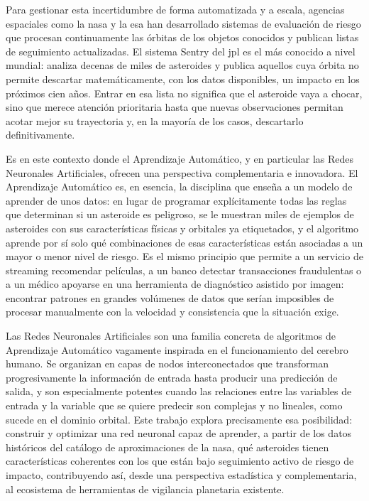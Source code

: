\documentclass[12pt]{report} %
\begin{document}
Para gestionar esta incertidumbre de forma automatizada y a escala, agencias espaciales como la \gls{nasa} y la \gls{esa} han desarrollado sistemas de evaluación de riesgo que procesan continuamente las órbitas de los objetos conocidos y publican listas de seguimiento actualizadas. El sistema Sentry del \gls{jpl} es el más conocido a nivel mundial: analiza decenas de miles de asteroides y publica aquellos cuya órbita no permite descartar matemáticamente, con los datos disponibles, un impacto en los próximos cien años. Entrar en esa lista no significa que el asteroide vaya a chocar, sino que merece atención prioritaria hasta que nuevas observaciones permitan acotar mejor su trayectoria y, en la mayoría de los casos, descartarlo definitivamente.
 
Es en este contexto donde el Aprendizaje Automático, y en particular las Redes Neuronales Artificiales, ofrecen una perspectiva complementaria e innovadora. El Aprendizaje Automático es, en esencia, la disciplina que enseña a un modelo de aprender de unos datos: en lugar de programar explícitamente todas las reglas que determinan si un asteroide es peligroso, se le muestran miles de ejemplos de asteroides con sus características físicas y orbitales ya etiquetados, y el algoritmo aprende por sí solo qué combinaciones de esas características están asociadas a un mayor o menor nivel de riesgo. Es el mismo principio que permite a un servicio de streaming recomendar películas, a un banco detectar transacciones fraudulentas o a un médico apoyarse en una herramienta de diagnóstico asistido por imagen: encontrar patrones en grandes volúmenes de datos que serían imposibles de procesar manualmente con la velocidad y consistencia que la situación exige.
 
Las Redes Neuronales Artificiales son una familia concreta de algoritmos de Aprendizaje Automático vagamente inspirada en el funcionamiento del cerebro humano. Se organizan en capas de nodos interconectados que transforman progresivamente la información de entrada hasta producir una predicción de salida, y son especialmente potentes cuando las relaciones entre las variables de entrada y la variable que se quiere predecir son complejas y no lineales, como sucede en el dominio orbital. Este trabajo explora precisamente esa posibilidad: construir y optimizar una red neuronal capaz de aprender, a partir de los datos históricos del catálogo de aproximaciones de la \gls{nasa}, qué asteroides tienen características coherentes con los que están bajo seguimiento activo de riesgo de impacto, contribuyendo así, desde una perspectiva estadística y complementaria, al ecosistema de herramientas de vigilancia planetaria existente.
\end{document}
